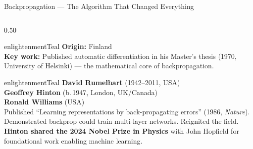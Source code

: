 \begin{frame}[shrink=25]{Backpropagation --- The Algorithm That Changed Everything}

  \begin{columns}[T]
    \begin{column}{0.50\textwidth}
      \begin{personbox}{enlightenmentTeal}
        \small
        \textbf{Origin:} Finland\\
        \textbf{Key work:} Published automatic differentiation in his
        Master's thesis (1970, University of Helsinki) --- the mathematical
        core of backpropagation.
      \end{personbox}

      \vspace{0.2em}
      \begin{personbox}{enlightenmentTeal}
        \small
        \textbf{David Rumelhart} (1942--2011, USA)\\
        \textbf{Geoffrey Hinton} (b.\,1947, London, UK/Canada)\\
        \textbf{Ronald Williams} (USA)\\[3pt]
        Published ``Learning representations by back-propagating errors''
        (1986, \emph{Nature}). Demonstrated backprop could train
        multi-layer networks. Reignited the field.\\[3pt]
        \textbf{Hinton shared the 2024 Nobel Prize in Physics}
        with John Hopfield for foundational work enabling machine learning.
      \end{personbox}
    \end{column}


\end{columns}
\end{frame}
